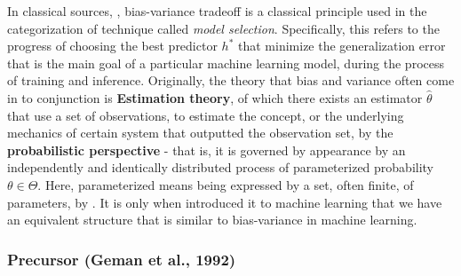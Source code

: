 In classical sources, \cite{gareth_james_introduction_2013,goodfellow2016deep,STL_Hajek_Maxim_2021,10.5555/2371238,10.5555/2621980}, bias-variance tradeoff is a classical principle used in the categorization of technique called \textit{model selection}. Specifically, this refers to the progress of choosing the best predictor $h^{*}$ that minimize the generalization error that is the main goal of a particular machine learning model, during the process of training and inference. Originally, the theory that bias and variance often come in to conjunction is \textbf{Estimation theory}, of which there exists an estimator $\hat{\theta}$ that use a set of observations, to estimate the concept, or the underlying mechanics of certain system that outputted the observation set, by the \textbf{probabilistic perspective} - that is, it is governed by appearance by an independently and identically distributed process of parameterized probability $\theta\in \Theta$. Here, parameterized means being expressed by a set, often finite, of parameters, by \cite{LehmannCasella_theory_1998,liam_statistics_2005}. It is only when \cite{6797087} introduced it to machine learning that we have an equivalent structure that is similar to bias-variance in machine learning. 

\subsubsection{Precursor (Geman et al., 1992)}

